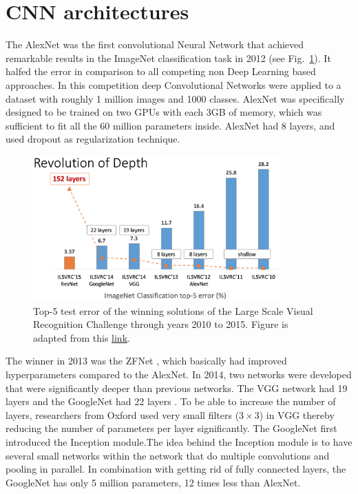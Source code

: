 \section{CNN architectures}\label{sec:CNNArchitectures}
The AlexNet was the first convolutional Neural Network that achieved remarkable results in the ImageNet classification task in 2012 (see Fig.~\ref{fig:imagenet}). It halfed the error in comparison to all competing non Deep Learning based approaches. In this competition deep Convolutional Networks were applied to a dataset with roughly 1 million images and 1000 classes. AlexNet was specifically designed to be trained on two GPUs with each 3GB of memory, which was sufficient to fit all the 60 million parameters inside. AlexNet had 8 layers, and used dropout as regularization technique.

\begin{figure}[h!]
	\centering
	\captionsetup{width=1\linewidth}
	\includegraphics[width=0.85\textwidth]{Figures/imagenet_evolution.png}
	\caption{Top-5 test error of the winning solutions of the Large Scale Visual Recognition Challenge through years 2010 to 2015. Figure is adapted from this  \href{http://kaiminghe.com/icml16tutorial/icml2016_tutorial_deep_residual_networks_kaiminghe.pdf}{link}.}
	\label{fig:imagenet}
\end{figure}

The winner in 2013 was the ZFNet \parencite{zeiler2013}, which basically had improved hyperparameters compared to the AlexNet. In 2014, two networks were developed that were significantly deeper than previous networks. The VGG network \parencite{simonyan2014} had 19 layers and the GoogleNet had 22 layers \parencite{szegedy2014}. To be able to increase the number of layers, researchers from Oxford used very small filters ($3\times3$) in VGG thereby reducing the number of parameters per layer significantly. The GoogleNet first introduced the Inception module.The idea behind the Inception module is to have several small networks within the network that do multiple convolutions and pooling in parallel. In combination with getting rid of fully connected layers, the GoogleNet has only 5 million parameters, 12 times less than AlexNet. 

